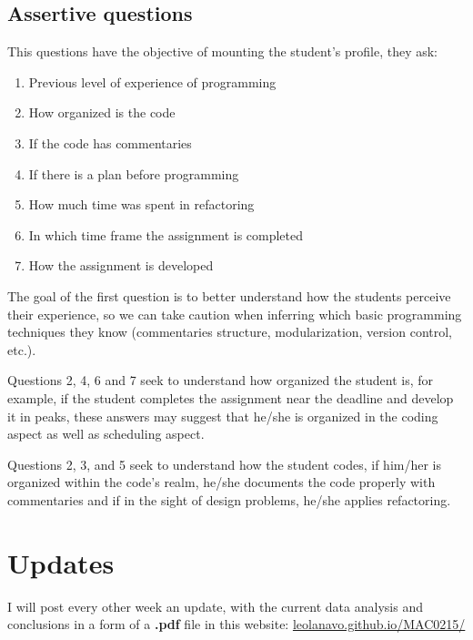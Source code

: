 \documentclass[a4paper, 12pt]{article}
\begin{document}
\subsection*{Assertive questions}
This questions have the objective of mounting the student's profile,
they ask:
\begin{enumerate}
\item Previous level of experience of programming
\item How organized is the code
\item If the code has commentaries
\item If there is a plan before programming
\item How much time was spent in refactoring
\item In which time frame the assignment is completed
\item How the assignment is developed
\end{enumerate}

The goal of the first question is to better understand how the students perceive their experience,
so we can take caution when inferring which basic programming techniques they know (commentaries
structure, modularization, version control, etc.).

Questions 2, 4, 6 and 7 seek to understand how organized the student is, for example, if the student
completes the assignment near the deadline and develop it in peaks, these answers may suggest that
he/she is organized in the coding aspect as well as scheduling aspect.

Questions 2, 3, and 5 seek to understand how the student codes, if him/her is organized within the
code's realm, he/she documents the code properly with commentaries and if in the sight of design problems,
he/she applies refactoring.

\section*{Updates}
I will post every other week an update, with the current data analysis and conclusions
in a form of a \textbf{.pdf} file in this website:
\url{leolanavo.github.io/MAC0215/}

\nocite{*}


\end{document}
